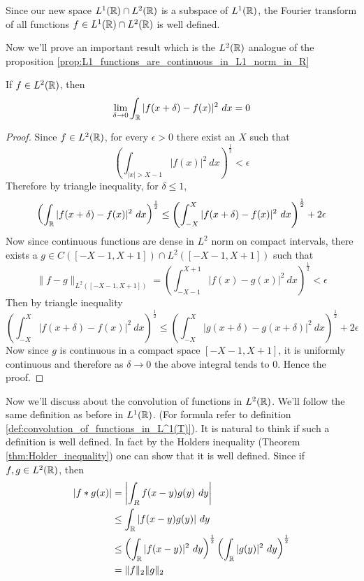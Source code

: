 Since our new space $L^1(\mathbb R) \cap L^2(\mathbb R)$ is a subspace of $L^1(\mathbb R)$, the Fourier transform of all functions $f \in L^1(\mathbb R) \cap L^2(\mathbb R)$ is well defined. 

Now we'll prove an important result which is the $L^2(\mathbb R)$ analogue of the proposition \ref{prop:L1_functions_are_continuous_in_L1_norm_in_R}

\begin{proposition}
  \label{prop:L2_functions_are_continuous_in_L2_norm_in_R}
  If $f\in L^2(\mathbb R)$, then $$\lim_{\delta \to 0} \int_\mathbb R |f(x+\delta) - f(x)|^2 \ dx = 0 $$
\end{proposition}
\begin{proof}
  Since $f\in L^2(\mathbb R)$, for every $\epsilon > 0$ there exist an $X$ such that $$\left( \int_{|x|> X-1} |f(x)|^2 \ dx \right)^{\frac{1}{2}} < \epsilon$$
  Therefore by triangle inequality, for $\delta \le 1$, $$ \left( \int_\mathbb R |f(x+\delta) - f(x)|^2 \ dx \right)^{\frac{1}{2}} \le \left( \int_{-X}^X |f(x+\delta) - f(x)|^2 \ dx \right)^{\frac{1}{2}} + 2\epsilon$$
  Now since continuous functions are dense in $L^2$ norm on compact intervals, there exists a $g \in C([-X-1, X+1])\cap L^2([-X-1, X+1])$ such that $$ \|f-g\|_{L^2([-X-1, X+1])} = \left( \int_{-X-1}^{X+1} |f(x) - g(x)|^2 \ dx \right)^{\frac{1}{2}} < \epsilon $$
  Then by triangle inequality $$ \left( \int_{-X}^X |f(x+\delta) - f(x)|^2 \ dx \right)^{\frac{1}{2}} \le \left( \int_{-X}^X |g(x+\delta) - g(x+\delta)|^2 \ dx \right)^{\frac{1}{2}} + 2\epsilon $$
  Now since $g$ is continuous in a compact space $[-X-1, X+1]$, it is uniformly continuous and therefore as $\delta \to 0$ the above integral tends to $0$. Hence the proof.
\end{proof}

Now we'll discuss about the convolution of functions in $L^2(\mathbb R)$. We'll follow the same definition as before in $L^1(\mathbb R)$. (For formula refer to definition \ref{def:convolution_of_functions_in_L^1(T)}). It is natural to think if such a definition is well defined. In fact by the Holders inequality (Theorem \ref{thm:Holder_inequality}) one can show that it is well defined. Since if $f, g \in L^2(\mathbb R)$, then 
  \begin{align*}
    |f*g(x)| &= \left|\int_R f(x-y)g(y) \ dy \right|\\
        &\le \int_\mathbb R |f(x-y)g(y)| \ dy \\
        &\le \left(\int_\mathbb R |f(x-y)|^2 \ dy \right)^{\frac{1}{2}} \left(\int_\mathbb R |g(y)|^2 \ dy \right)^{\frac{1}{2}} \\
        &= \|f\|_2 \|g\|_2
  \end{align*}

